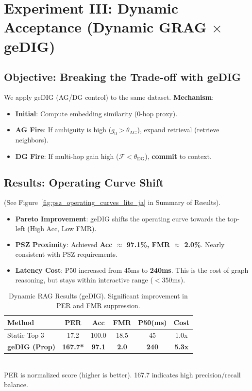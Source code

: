 \documentclass[12pt]{article}
\newcommand{\F}{\mathcal{F}}
\begin{document}
\section{Experiment III: Dynamic Acceptance (Dynamic GRAG \texorpdfstring{$\times$}{x} geDIG)}
\label{sec:dynamic_rag_experiment}

\subsection{Objective: Breaking the Trade-off with geDIG}
We apply geDIG (AG/DG control) to the same dataset.
\textbf{Mechanism}:
\begin{itemize}
    \item \textbf{Initial}: Compute embedding similarity (0-hop proxy).
    \item \textbf{AG Fire}: If ambiguity is high ($g_0 > \theta_{\mathrm{AG}}$), expand retrieval (retrieve neighbors).
    \item \textbf{DG Fire}: If multi-hop gain high ($\F < \theta_{\mathrm{DG}}$), \textbf{commit} to context.
\end{itemize}

\subsection{Results: Operating Curve Shift}
(See Figure~\ref{fig:psz_operating_curves_lite_ja} in Summary of Results).
\begin{itemize}
    \item \textbf{Pareto Improvement}: geDIG shifts the operating curve towards the top-left (High Acc, Low FMR).
    \item \textbf{PSZ Proximity}: Achieved \textbf{Acc $\approx$ 97.1\%, FMR $\approx$ 2.0\%}. Nearly consistent with PSZ requirements.
    \item \textbf{Latency Cost}: P50 increased from 45ms to \textbf{240ms}. This is the cost of graph reasoning, but stays within interactive range ($<350$ms).
\end{itemize}

\begin{table}[H]
    \centering
    \caption{Dynamic RAG Results (geDIG). Significant improvement in PER and FMR suppression.}
    \label{tab:rag_dynamic_result}
    \small
    \begin{tabular}{lccccc}
    \toprule
    Method & PER & Acc & FMR & P50(ms) & Cost \\
    \midrule
    Static Top-3 & 17.2 & 100.0 & 18.5 & 45 & 1.0x \\
    \textbf{geDIG (Prop)} & \textbf{167.7*} & \textbf{97.1} & \textbf{2.0} & \textbf{240} & \textbf{5.3x} \\
    \bottomrule
    \end{tabular}
    \\ \footnotesize *PER is normalized score (higher is better). 167.7 indicates high precision/recall balance.
\end{table}
\end{document}
